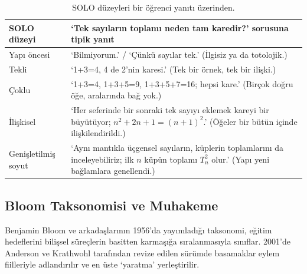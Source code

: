 \begin{table}[h]
\centering\small
\renewcommand{\arraystretch}{1.3}
\begin{tabularx}{\linewidth}{>{\raggedright\arraybackslash}p{2.6cm}>{\raggedright\arraybackslash}X}
\toprule
\textbf{SOLO düzeyi} & \textbf{‘Tek sayıların toplamı neden tam karedir?’ sorusuna tipik yanıt}\\
\midrule
Yapı öncesi & ‘Bilmiyorum.’ / ‘Çünkü sayılar tek.’ (İlgisiz ya da totolojik.)\\
Tekli & ‘1+3=4, 4 de 2’nin karesi.’ (Tek bir örnek, tek bir ilişki.)\\
Çoklu & ‘1+3=4, 1+3+5=9, 1+3+5+7=16; hepsi kare.’ (Birçok doğru öğe, aralarında bağ yok.)\\
İlişkisel & ‘Her seferinde bir sonraki tek sayıyı eklemek kareyi bir büyütüyor; $n^2+2n+1=(n+1)^2$.’ (Öğeler bir bütün içinde ilişkilendirildi.)\\
Genişletilmiş soyut & ‘Aynı mantıkla üçgensel sayıların, küplerin toplamlarını da inceleyebiliriz; ilk $n$ küpün toplamı $T_n^2$ olur.’ (Yapı yeni bağlamlara genellendi.)\\
\bottomrule
\end{tabularx}
\caption{SOLO düzeyleri bir öğrenci yanıtı üzerinden.}
\end{table}

\subsection{Bloom Taksonomisi ve Muhakeme}

Benjamin Bloom ve arkadaşlarının 1956’da yayımladığı taksonomi, eğitim hedeflerini bilişsel süreçlerin basitten karmaşığa sıralanmasıyla sınıflar. 2001’de Anderson ve Krathwohl tarafından revize edilen sürümde basamaklar eylem fiilleriyle adlandırılır ve en üste ‘yaratma’ yerleştirilir.

